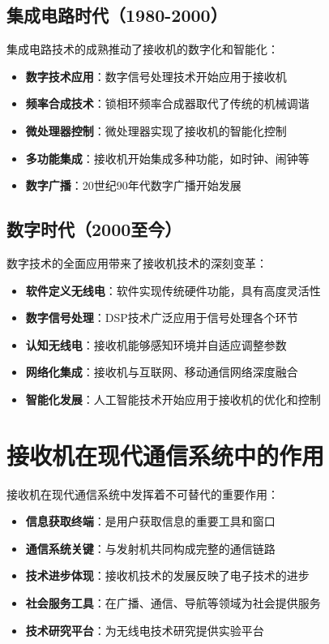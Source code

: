 \documentclass[12pt,UTF8]{ctexbook}
\begin{document}
\subsection{集成电路时代（1980-2000）}

集成电路技术的成熟推动了接收机的数字化和智能化：

\begin{itemize}[leftmargin=3.5em]
    \item \textbf{数字技术应用}：数字信号处理技术开始应用于接收机
    \item \textbf{频率合成技术}：锁相环频率合成器取代了传统的机械调谐
    \item \textbf{微处理器控制}：微处理器实现了接收机的智能化控制
    \item \textbf{多功能集成}：接收机开始集成多种功能，如时钟、闹钟等
    \item \textbf{数字广播}：20世纪90年代数字广播开始发展
\end{itemize}

\subsection{数字时代（2000至今）}

数字技术的全面应用带来了接收机技术的深刻变革：

\begin{itemize}[leftmargin=3.5em]
    \item \textbf{软件定义无线电}：软件实现传统硬件功能，具有高度灵活性
    \item \textbf{数字信号处理}：DSP技术广泛应用于信号处理各个环节
    \item \textbf{认知无线电}：接收机能够感知环境并自适应调整参数
    \item \textbf{网络化集成}：接收机与互联网、移动通信网络深度融合
    \item \textbf{智能化发展}：人工智能技术开始应用于接收机的优化和控制
\end{itemize}

\section{接收机在现代通信系统中的作用}

接收机在现代通信系统中发挥着不可替代的重要作用：

\begin{itemize}[leftmargin=3.5em]
    \item \textbf{信息获取终端}：是用户获取信息的重要工具和窗口
    \item \textbf{通信系统关键}：与发射机共同构成完整的通信链路
    \item \textbf{技术进步体现}：接收机技术的发展反映了电子技术的进步
    \item \textbf{社会服务工具}：在广播、通信、导航等领域为社会提供服务
    \item \textbf{技术研究平台}：为无线电技术研究提供实验平台
\end{itemize}
\end{document}
